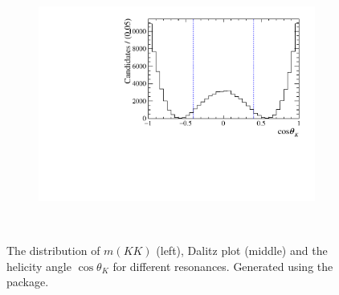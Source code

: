\begin{figure}[!ht]
\begin{subfigure}[t]{0.32\textwidth}
        \includegraphics[width=1.0\textwidth]{figs/B2DsPhi/a2_1320_Helicity.pdf}
    \end{subfigure}\\



    \caption{The distribution of $m(KK)$ (left), Dalitz plot (middle) and the helicity angle $\cos\theta_{K}$ for different resonances. Generated using the \laurapp package.} 
    \label{fig:model_two}   
\end{figure}



